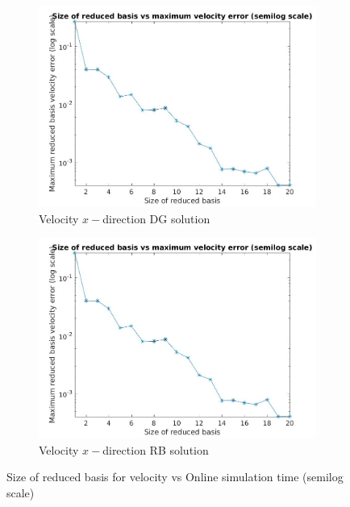 \documentclass[graybox]{svmult}
\begin{document}
\begin{figure}
\begin{subfigure}{0.48\textwidth}
\includegraphics[width=\linewidth]{size_vs_maximum_reduced_basis_velocity_error_semilog.jpg}
\caption{Velocity $x-$direction DG solution} \label{vel_x_dg}
\end{subfigure}\hspace*{\fill}
\begin{subfigure}{0.48\textwidth}
\includegraphics[width=\linewidth]{size_vs_maximum_reduced_basis_velocity_error_semilog.jpg}
\caption{Velocity $x-$direction RB solution} \label{vel_x_rb}
\end{subfigure}
  \caption{Size of reduced basis for velocity vs Online simulation time (semilog scale)} 
\label{online_simulation_time}
\end{figure}




\end{document}
